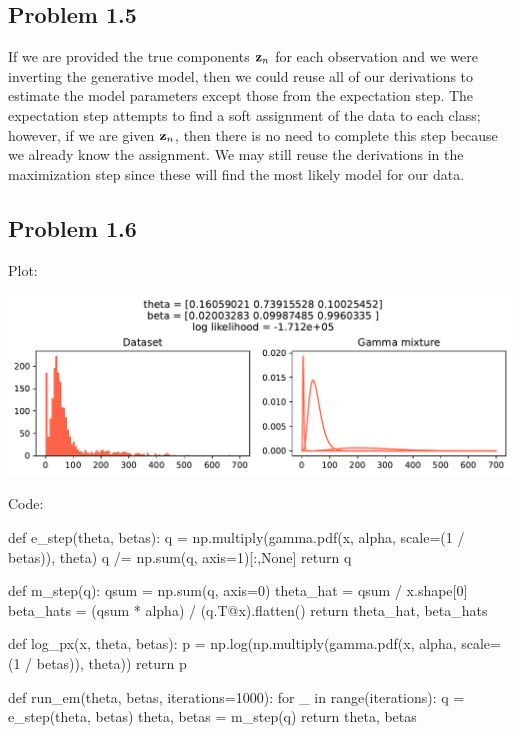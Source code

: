 \documentclass[submit]{harvardml}
\begin{document}
\subsection*{Problem 1.5}
If we are provided the true components $\vb{z}_n$ for each observation and we were inverting the generative model, then we could reuse all of our derivations to estimate the model parameters except those from the expectation step. The expectation step attempts to find a soft assignment of the data to each class; however, if we are given $\vb{z}_n$, then there is no need to complete this step because we already know the assignment. We may still reuse the derivations in the maximization step since these will find the most likely model for our data.

\newpage
\subsection*{Problem 1.6}
Plot:

\includegraphics[width=\linewidth]{p1}

Code:

\begin{python}
def e_step(theta, betas):
    q = np.multiply(gamma.pdf(x, alpha, scale=(1 / betas)), theta)
    q /= np.sum(q, axis=1)[:,None]
    return q


def m_step(q):
    qsum = np.sum(q, axis=0)
    theta_hat = qsum / x.shape[0]
    beta_hats = (qsum * alpha) / (q.T@x).flatten()
    return theta_hat, beta_hats


def log_px(x, theta, betas):
    p = np.log(np.multiply(gamma.pdf(x, alpha, scale=(1 / betas)), theta))
    return p


def run_em(theta, betas, iterations=1000):
    for _ in range(iterations):
        q = e_step(theta, betas)
        theta, betas = m_step(q)
    return theta, betas
\end{python}


\newpage
\end{document}
